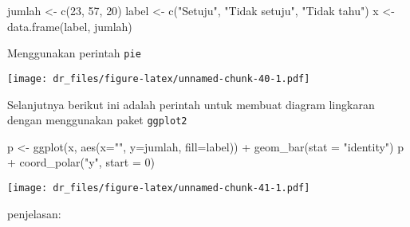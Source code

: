 \documentclass[
]{book}
\newenvironment{Shaded}{\begin{snugshade}}{\end{snugshade}}
\newcommand{\AttributeTok}[1]{\textcolor[rgb]{0.77,0.63,0.00}{#1}}
\newcommand{\DecValTok}[1]{\textcolor[rgb]{0.00,0.00,0.81}{#1}}
\newcommand{\FunctionTok}[1]{\textcolor[rgb]{0.00,0.00,0.00}{#1}}
\newcommand{\NormalTok}[1]{#1}
\newcommand{\OtherTok}[1]{\textcolor[rgb]{0.56,0.35,0.01}{#1}}
\newcommand{\SpecialCharTok}[1]{\textcolor[rgb]{0.00,0.00,0.00}{#1}}
\newcommand{\StringTok}[1]{\textcolor[rgb]{0.31,0.60,0.02}{#1}}
\begin{document}
\begin{Shaded}
\begin{Highlighting}[]
\NormalTok{jumlah }\OtherTok{\textless{}{-}} \FunctionTok{c}\NormalTok{(}\DecValTok{23}\NormalTok{, }\DecValTok{57}\NormalTok{, }\DecValTok{20}\NormalTok{)}
\NormalTok{label }\OtherTok{\textless{}{-}} \FunctionTok{c}\NormalTok{(}\StringTok{"Setuju"}\NormalTok{, }\StringTok{"Tidak setuju"}\NormalTok{, }\StringTok{"Tidak tahu"}\NormalTok{)}
\NormalTok{x }\OtherTok{\textless{}{-}} \FunctionTok{data.frame}\NormalTok{(label, jumlah)}
\end{Highlighting}
\end{Shaded}

Menggunakan perintah \texttt{pie}

\begin{Shaded}
\end{Shaded}

\texttt{[image: dr\_files/figure-latex/unnamed-chunk-40-1.pdf]}

Selanjutnya berikut ini adalah perintah untuk membuat diagram lingkaran dengan menggunakan paket \texttt{ggplot2}

\begin{Shaded}
\begin{Highlighting}[]
\NormalTok{p }\OtherTok{\textless{}{-}} \FunctionTok{ggplot}\NormalTok{(x, }\FunctionTok{aes}\NormalTok{(}\AttributeTok{x=}\StringTok{""}\NormalTok{, }\AttributeTok{y=}\NormalTok{jumlah, }\AttributeTok{fill=}\NormalTok{label)) }\SpecialCharTok{+}
  \FunctionTok{geom\_bar}\NormalTok{(}\AttributeTok{stat =} \StringTok{"identity"}\NormalTok{)}
\NormalTok{p }\SpecialCharTok{+} \FunctionTok{coord\_polar}\NormalTok{(}\StringTok{"y"}\NormalTok{, }\AttributeTok{start =} \DecValTok{0}\NormalTok{)}
\end{Highlighting}
\end{Shaded}

\texttt{[image: dr\_files/figure-latex/unnamed-chunk-41-1.pdf]}

penjelasan:
\end{document}
